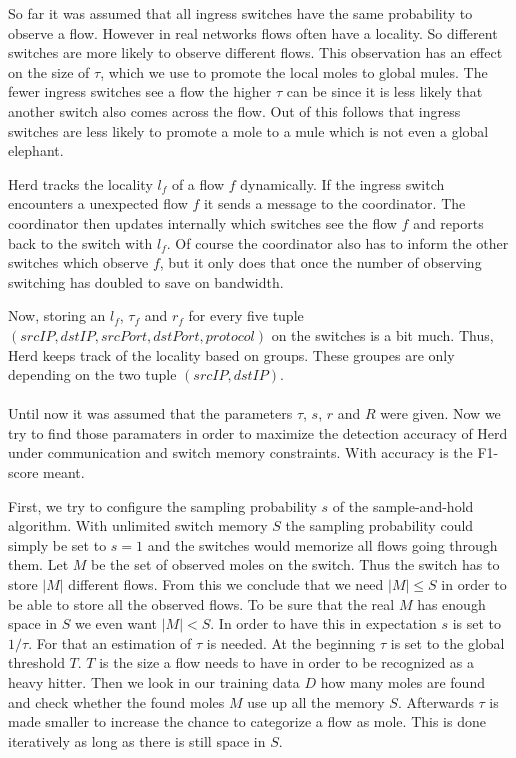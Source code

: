 \documentclass[11pt,oneside,a4paper]{article}
\begin{document}
So far it was assumed that all ingress switches have the same probability to observe a flow. However in real networks flows often have a locality. So different switches are more likely to observe different flows. This observation has an effect on the size of $\tau$, which we use to promote the local moles to global mules. The fewer ingress switches see a flow the higher $\tau$ can be since it is less likely that another switch also comes across the flow. Out of this follows that ingress switches are less likely to promote a mole to a mule which is not even a global elephant.

Herd tracks the locality $l_f$ of a flow $f$ dynamically. If the ingress switch encounters a unexpected flow $f$ it sends a message to the coordinator. The coordinator then updates internally which switches see the flow $f$ and reports back to the switch with $l_f$. Of course the coordinator also has to inform the other switches which observe $f$, but it only does that once the number of observing switching has doubled to save on bandwidth.

Now, storing an $l_f$, $\tau_f$ and $r_f$ for every five tuple $(srcIP, dstIP, srcPort, dstPort, protocol)$ on the switches is a bit much. Thus, Herd keeps track of the locality based on groups. These groupes are only depending on the two tuple $(srcIP, dstIP)$.\\\\

Until now it was assumed that the parameters $\tau$, $s$, $r$ and $R$ were given. Now we try to find those paramaters in order to maximize the detection accuracy of Herd under communication and switch memory constraints. With accuracy is the F1-score meant. 

First, we try to configure the sampling probability $s$ of the sample-and-hold algorithm. With unlimited switch memory $S$ the sampling probability could simply be set to $s=1$ and the switches would memorize all flows going through them. Let $M$ be the set of observed moles on the switch. Thus the switch has to store $|M|$ different flows. From this we conclude that we need $|M| \leq S$ in order to be able to store all the observed flows. To be sure that the real $M$ has enough space in $S$ we even want $|M| < S$. In order to have this in expectation $s$ is set to $1/\tau$. For that an estimation of $\tau$ is needed. At the beginning $\tau$ is set to the global threshold $T$. $T$ is the size a flow needs to have in order to be recognized as a heavy hitter. Then we look in our training data $D$ how many moles are found and check whether the found moles $M$ use up all the memory $S$. Afterwards $\tau$ is made smaller to increase the chance to categorize a flow as mole. This is done iteratively as long as there is still space in $S$. 
\end{document}
